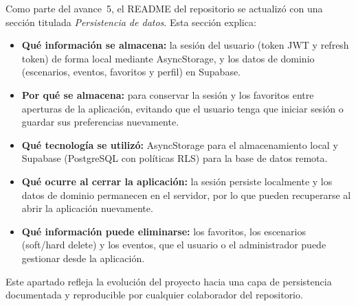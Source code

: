 Como parte del avance~5, el README del repositorio se actualiz\'o con una
secci\'on titulada \textit{Persistencia de datos}. Esta secci\'on
explica:

\begin{itemize}
  \item \textbf{Qu\'e informaci\'on se almacena:} la sesi\'on del usuario
    (token JWT y refresh token) de forma local mediante AsyncStorage, y
    los datos de dominio (escenarios, eventos, favoritos y perfil) en
    Supabase.

  \item \textbf{Por qu\'e se almacena:} para conservar la sesi\'on y los
    favoritos entre aperturas de la aplicaci\'on, evitando que el usuario
    tenga que iniciar sesi\'on o guardar sus preferencias
    nuevamente.

  \item \textbf{Qu\'e tecnolog\'ia se utiliz\'o:} AsyncStorage para el
    almacenamiento local y Supabase (PostgreSQL con pol\'iticas RLS)
    para la base de datos remota.

  \item \textbf{Qu\'e ocurre al cerrar la aplicaci\'on:} la sesi\'on
    persiste localmente y los datos de dominio permanecen en el servidor,
    por lo que pueden recuperarse al abrir la aplicaci\'on nuevamente.

  \item \textbf{Qu\'e informaci\'on puede eliminarse:} los favoritos,
    los escenarios (soft/hard delete) y los eventos, que el usuario o
    el administrador puede gestionar desde la aplicaci\'on.
\end{itemize}

Este apartado refleja la evoluci\'on del proyecto hacia una capa de
persistencia documentada y reproducible por cualquier colaborador del
repositorio.
